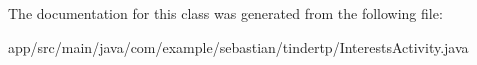 The documentation for this class was generated from the following file\+:\begin{DoxyCompactItemize}
\item 
app/src/main/java/com/example/sebastian/tindertp/Interests\+Activity.\+java\end{DoxyCompactItemize}
